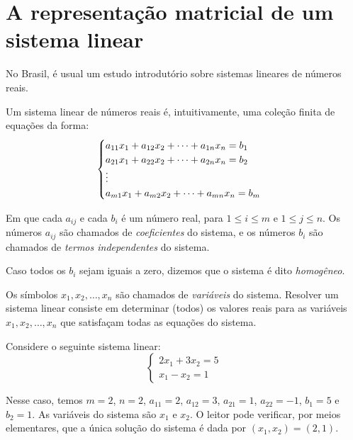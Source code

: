 \section{A representação matricial de um sistema linear}

No Brasil, é usual um estudo introdutório sobre sistemas lineares de números reais.

Um sistema linear de números reais é, intuitivamente, uma coleção finita de equações da forma:
\begin{equation}\label{eq:sistemaLinear}\index{sistema linear}
    \begin{cases}
        a_{11}x_1 + a_{12}x_2 + \cdots + a_{1n}x_n = b_1 \\
        a_{21}x_1 + a_{22}x_2 + \cdots + a_{2n}x_n = b_2 \\
        \vdots \\
        a_{m1}x_1 + a_{m2}x_2 + \cdots + a_{mn}x_n = b_m
    \end{cases}
\end{equation}

Em que cada $a_{ij}$ e cada $b_i$ é um número real, para $1 \leq i \leq m$ e $1 \leq j \leq n$.
Os números $a_{ij}$ são chamados de \emph{coeficientes} do sistema, e os números $b_i$ são chamados de \emph{termos independentes} do sistema.

Caso todos os $b_i$ sejam iguais a zero, dizemos que o sistema é dito \emph{homogêneo}.

Os símbolos $x_1, x_2, \ldots, x_n$ são chamados de \emph{variáveis} do sistema.
Resolver um sistema linear consiste em determinar (todos) os valores reais para as variáveis $x_1, x_2, \ldots, x_n$ que satisfaçam todas as equações do sistema.

\begin{example}
    Considere o seguinte sistema linear:
    \begin{equation}\label{eq:exemploVar1}
        \begin{cases}
            2x_1 + 3x_2 = 5 \\
            x_1 - x_2 = 1
        \end{cases}
    \end{equation}

    Nesse caso, temos $m=2$, $n=2$, $a_{11}=2$, $a_{12}=3$, $a_{21}=1$, $a_{22}=-1$, $b_1=5$ e $b_2=1$.
    As variáveis do sistema são $x_1$ e $x_2$.
    O leitor pode verificar, por meios elementares, que a única solução do sistema é dada por $(x_1, x_2)=(2, 1)$.
\end{example}

